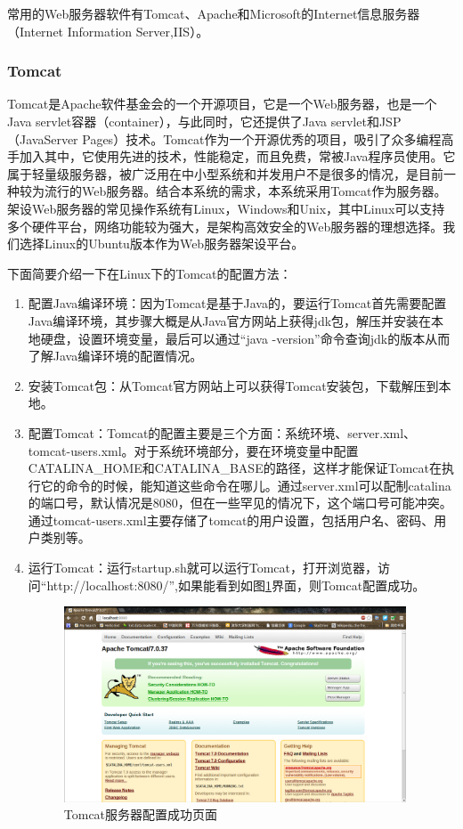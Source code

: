 \documentclass[12pt,a4paper]{article}
\begin{document}
	常用的Web服务器软件有Tomcat、Apache和Microsoft的Internet信息服务器（Internet Information Server,IIS）。

		\subsubsection{Tomcat}
	Tomcat是Apache软件基金会的一个开源项目，它是一个Web服务器，也是一个Java servlet容器（container），与此同时，它还提供了Java servlet和JSP（JavaServer Pages）技术。Tomcat作为一个开源优秀的项目，吸引了众多编程高手加入其中，它使用先进的技术，性能稳定，而且免费，常被Java程序员使用。它属于轻量级服务器，被广泛用在中小型系统和并发用户不是很多的情况，是目前一种较为流行的Web服务器。结合本系统的需求，本系统采用Tomcat作为服务器。架设Web服务器的常见操作系统有Linux，Windows和Unix，其中Linux可以支持多个硬件平台，网络功能较为强大，是架构高效安全的Web服务器的理想选择。我们选择Linux的Ubuntu版本作为Web服务器架设平台。
	
	下面简要介绍一下在Linux下的Tomcat的配置方法：
	
	\begin{enumerate}
		\item 配置Java编译环境：因为Tomcat是基于Java的，要运行Tomcat首先需要配置Java编译环境，其步骤大概是从Java官方网站上获得jdk包，解压并安装在本地硬盘，设置环境变量，最后可以通过“java -version”命令查询jdk的版本从而了解Java编译环境的配置情况。
		\item 安装Tomcat包：从Tomcat官方网站上可以获得Tomcat安装包，下载解压到本地。
		\item 配置Tomcat：Tomcat的配置主要是三个方面：系统环境、server.xml、tomcat-users.xml。对于系统环境部分，要在环境变量中配置CATALINA\_{}HOME和CATALINA\_{}BASE的路径，这样才能保证Tomcat在执行它的命令的时候，能知道这些命令在哪儿。通过server.xml可以配制catalina的端口号，默认情况是8080，但在一些罕见的情况下，这个端口号可能冲突。通过tomcat-users.xml主要存储了tomcat的用户设置，包括用户名、密码、用户类别等。
		\item 运行Tomcat：运行startup.sh就可以运行Tomcat，打开浏览器，访问“http://localhost:8080/”,如果能看到如图\ref{fig:Tomcat服务器配置成功}界面，则Tomcat配置成功。
	\begin{figure}[htbp] 
	\centering\includegraphics[width=4in]{fig/tomcatsuccess.png} 
	\caption{Tomcat服务器配置成功页面}\label{fig:Tomcat服务器配置成功} 
	\end{figure} 
	\end{enumerate}
	
\end{document}
